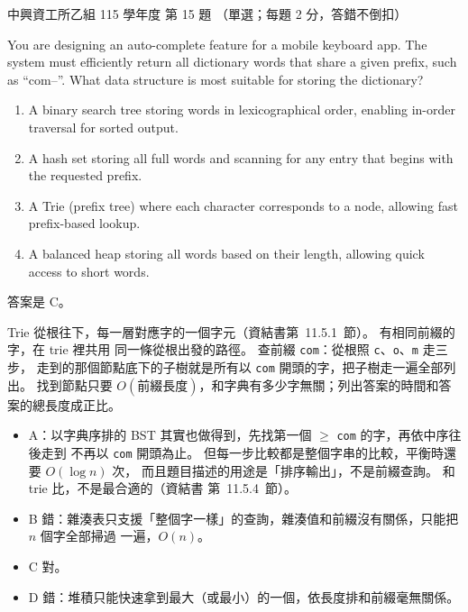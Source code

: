 \begin{pastexam}[label={px:nchu-115-is-15}]{中興資工所乙組 115 學年度 第 15 題}
（單選；每題 2 分，答錯不倒扣）

You are designing an auto-complete feature for a mobile keyboard app. The system must
efficiently return all dictionary words that share a given prefix, such as ``com--''. What data
structure is most suitable for storing the dictionary?
\begin{enumerate}[label=\Alph*.,nosep]
\item A binary search tree storing words in lexicographical order, enabling in-order traversal
for sorted output.
\item A hash set storing all full words and scanning for any entry that begins with the requested
prefix.
\item A Trie (prefix tree) where each character corresponds to a node, allowing fast
prefix-based lookup.
\item A balanced heap storing all words based on their length, allowing quick access to short
words.
\end{enumerate}
\end{pastexam}

\begin{pastsoln}
答案是 C。

Trie 從根往下，每一層對應字的一個字元（資結書第~11.5.1~節）。 有相同前綴的字，在 trie 裡共用
同一條從根出發的路徑。 查前綴 \texttt{com}：從根照 \texttt{c}、\texttt{o}、\texttt{m} 走三步，
走到的那個節點底下的子樹就是所有以 \texttt{com} 開頭的字，把子樹走一遍全部列出。 找到節點只要
$O(\text{前綴長度})$，和字典有多少字無關；列出答案的時間和答案的總長度成正比。
\begin{itemize}
\item A：以字典序排的 BST 其實也做得到，先找第一個 $\ge$ \texttt{com} 的字，再依中序往後走到
不再以 \texttt{com} 開頭為止。 但每一步比較都是整個字串的比較，平衡時還要 $O(\log n)$ 次，
而且題目描述的用途是「排序輸出」，不是前綴查詢。 和 trie 比，不是最合適的（資結書
第~11.5.4~節）。
\item B 錯：雜湊表只支援「整個字一樣」的查詢，雜湊值和前綴沒有關係，只能把 $n$ 個字全部掃過
一遍，$O(n)$。
\item C 對。
\item D 錯：堆積只能快速拿到最大（或最小）的一個，依長度排和前綴毫無關係。
\end{itemize}
\end{pastsoln}
